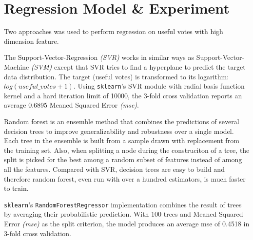 \documentclass[a4paper,12pt,title]{article}
\begin{document}
\section{Regression Model \& Experiment}
Two approaches was used to perform regression on useful votes with high dimension feature.

The Support-Vector-Regression \textit{(SVR)} works in similar ways as Support-Vector-Machine \textit{(SVM)} except that SVR tries to find a hyperplane to predict the target data distribution. The target (useful votes) is transformed to its logarithm: $log(useful\_votes+1)$. Using \texttt{sklearn}'s SVR module with radial basis function kernel and a hard iteration limit of 10000, the 3-fold cross validation reports an average 0.6895 Meaned Squared Error \textit{(mse)}.

Random forest is an ensemble method that combines the predictions of several decision trees to improve generalizability and robustness over a single model. Each tree in the ensemble is built from a sample drawn with replacement from the training set. Also, when splitting a node during the construciton of a tree, the split is picked for the best among a random subset of features instead of among all the features. Compared with SVR, decision trees are easy to build and therefore random forest, even run with over a hundred estimators, is much faster to train. 

\texttt{sklearn}'s \texttt{RandomForestRegressor} implementation combines the result of trees by averaging their probabilistic prediction. With 100 trees and Meaned Squared Error \textit{(mse)} as the split criterion, the model produces an average mse of 0.4518 in 3-fold cross validation. 
\end{document}
